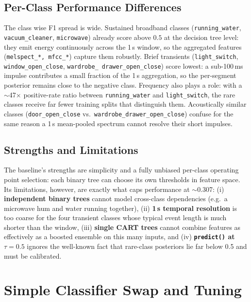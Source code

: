 \documentclass{article}
\begin{document}
\subsection{Per-Class Performance Differences}
The class wise F1 spread is wide. Sustained broadband classes
(\texttt{running\_water}, \texttt{vacuum\_cleaner}, \texttt{microwave})
already score above $0.5$ at the decision tree level: they emit
energy continuously across the 1\,s window, so the aggregated features
(\texttt{melspect\_*, mfcc\_*}) capture them robustly. Brief transients
(\texttt{light\_switch}, \texttt{window\_open\_close}, \texttt{wardrobe\_
drawer\_open\_close}) score lowest: a sub-100\,ms impulse contributes a
small fraction of the 1\,s aggregation, so the per-segment posterior
remains close to the negative class. Frequency also plays a role: with a
$\sim$47$\times$ positive-rate ratio between \texttt{running\_water} and
\texttt{light\_switch}, the rare classes receive far fewer training
splits that distinguish them. Acoustically similar classes
(\texttt{door\_open\_close} vs.\ \texttt{wardrobe\_drawer\_open\_close})
confuse for the same reason a 1\,s mean-pooled spectrum cannot resolve
their short impulses.

\subsection{Strengths and Limitations}
The baseline's strengths are simplicity and a fully unbiased per-class
operating point selection: each binary tree can choose its own
thresholds in feature space. Its limitations, however, are exactly what
caps performance at $\sim$0.307: (i) \textbf{independent binary trees}
cannot model cross-class dependencies (e.g.\ a microwave hum and water
running together), (ii) \textbf{1\,s temporal resolution} is too coarse
for the four transient classes whose typical event length is much
shorter than the window, (iii) \textbf{single CART trees} cannot
combine features as effectively as a boosted ensemble on this many
inputs, and (iv) \textbf{\texttt{predict()} at $\tau{=}0.5$} ignores
the well-known fact that rare-class posteriors lie far below 0.5 and
must be calibrated.

\section{Simple Classifier Swap and Tuning}
\label{sec:simple}
\end{document}
